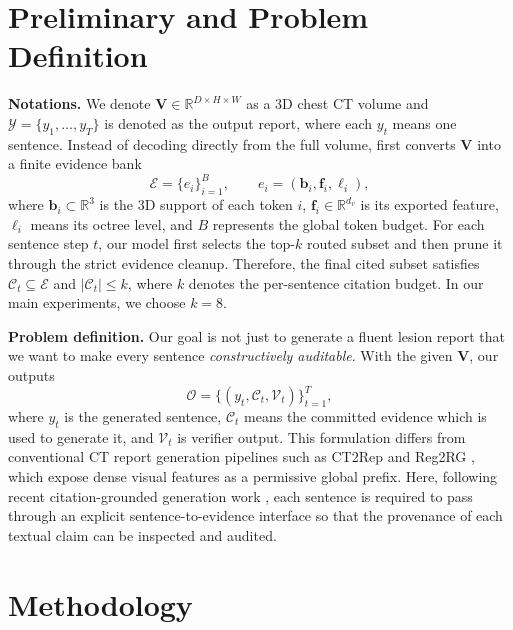 \section{Preliminary and Problem Definition}
\label{sec:preliminary}

\noindent\textbf{Notations.}
We denote $\mathbf{V}\in\mathbb{R}^{D\times H\times W}$ as a 3D chest CT volume and
$\mathcal{Y}=\{y_1,\dots,y_T\}$ is denoted as the output report, where each $y_t$ means one sentence.
Instead of decoding directly from the full volume, \method{} first converts $\mathbf{V}$ into
a finite evidence bank
\begin{equation}
\mathcal{E}=\{e_i\}_{i=1}^{B},
\qquad
e_i=(\mathbf{b}_i,\mathbf{f}_i,\ell_i),
\label{eq:evidence_bank_new}
\end{equation}
where $\mathbf{b}_i\subset\mathbb{R}^3$ is the 3D support of each token $i$, $\mathbf{f}_i\in\mathbb{R}^{d_v}$
is its exported feature, $\ell_i$ means its octree level, and $B$ represents the global token budget.
For each sentence step $t$, our model first selects the top-$k$ routed subset and then prune it through the strict evidence cleanup. Therefore, the final cited subset satisfies $\mathcal{C}_t\subseteq\mathcal{E}$ and $|\mathcal{C}_t|\leq k$, where $k$ denotes the per-sentence citation budget. In our main experiments, we choose $k=8$.


\noindent\textbf{Problem definition.}
Our goal is not just to generate a fluent lesion report that we want to make every sentence
\emph{constructively auditable}. With the given $\mathbf{V}$, our \method{} outputs
\begin{equation}
\mathcal{O}=
\Big\{(y_t,\mathcal{C}_t,\mathcal{V}_t)\Big\}_{t=1}^{T},
\label{eq:output_objective_new}
\end{equation}
where $y_t$ is the generated sentence, $\mathcal{C}_t$ means the committed evidence which is used to generate it,
and $\mathcal{V}_t$ is verifier output. This formulation differs from conventional CT report generation pipelines such as CT2Rep \cite{hamamci2024ct2rep} and Reg2RG \cite{chen2025reg2rg}, which expose dense visual features as a permissive global prefix. Here, following recent citation-grounded generation work \cite{xia2025reclaim,zhang2025longcite}, each sentence is required to pass through an explicit sentence-to-evidence interface so that the provenance of each textual claim can be inspected and audited.



\section{Methodology}
\label{sec:method}

